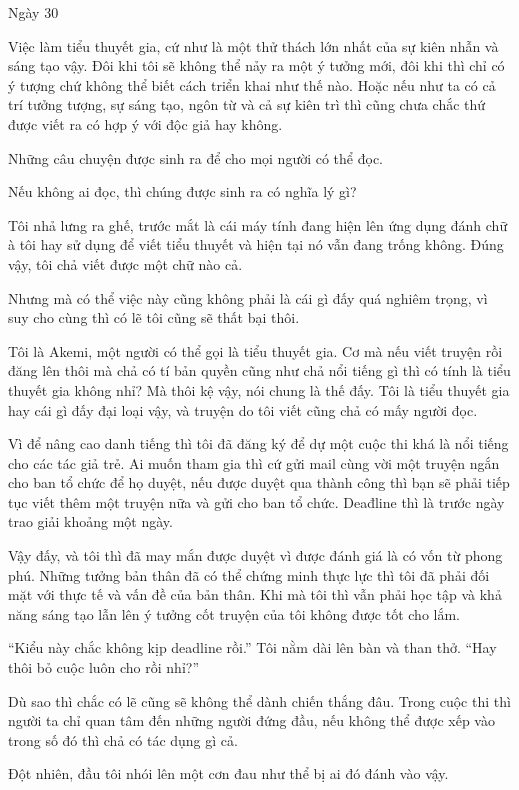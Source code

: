 {Ngày 30}
{
Việc làm tiểu thuyết gia, cứ như là một thử thách lớn nhất của sự kiên
nhẫn và sáng tạo vậy. Đôi khi tôi sẽ không thể nảy ra một ý tưởng mới,
đôi khi thì chỉ có ý tượng chứ không thể biết cách triển khai như thế
nào. Hoặc nếu như ta có cả trí tưởng tượng, sự sáng tạo, ngôn từ và cả
sự kiên trì thì cũng chưa chắc thứ được viết ra có hợp ý với độc giả hay
không.

Những câu chuyện được sinh ra để cho mọi người có thể đọc.

Nếu không ai đọc, thì chúng được sinh ra có nghĩa lý gì?

Tôi nhả lưng ra ghế, trước mắt là cái máy tính đang hiện lên ứng dụng
đánh chữ à tôi hay sử dụng để viết tiểu thuyết và hiện tại nó vẫn đang
trống không. Đúng vậy, tôi chả viết được một chữ nào cả.

Nhưng mà có thể việc này cũng không phải là cái gì đấy quá nghiêm trọng,
vì suy cho cùng thì có lẽ tôi cũng sẽ thất bại thôi.

Tôi là Akemi, một người có thể gọi là tiểu thuyết gia. Cơ mà nếu viết
truyện rồi đăng lên thôi mà chả có tí bản quyền cũng như chả nổi tiếng
gì thì có tính là tiểu thuyết gia không nhỉ? Mà thôi kệ vậy, nói chung
là thế đấy. Tôi là tiểu thuyết gia hay cái gì đấy đại loại vậy, và
truyện do tôi viết cũng chả có mấy người đọc.

Vì để nâng cao danh tiếng thì tôi đã đăng ký để dự một cuộc thi khá là
nổi tiếng cho các tác giả trẻ. Ai muốn tham gia thì cứ gửi mail cùng vời
một truyện ngắn cho ban tổ chức để họ duyệt, nếu được duyệt qua thành
công thì bạn sẽ phải tiếp tục viết thêm một truyện nữa và gửi cho ban tổ
chức. Deađline thì là trước ngày trao giải khoảng một ngày.

Vậy đấy, và tôi thì đã may mắn được duyệt vì được đánh giá là có vốn từ
phong phú. Những tưởng bản thân đã có thể chứng minh thực lực thì tôi đã
phải đối mặt với thực tế và vấn đề của bản thân. Khi mà tôi thì vẫn phải
học tập và khả năng sáng tạo lẫn lên ý tưởng cốt truyện của tôi không
được tốt cho lắm.

``Kiểu này chắc không kịp deadline rồi.'' Tôi nằm dài lên bàn và than
thở. ``Hay thôi bỏ cuộc luôn cho rồi nhỉ?''

Dù sao thì chắc có lẽ cũng sẽ không thể dành chiến thắng đâu. Trong cuộc
thi thì người ta chỉ quan tâm đến những người đứng đầu, nếu không thể
được xếp vào trong số đó thì chả có tác dụng gì cả.

Đột nhiên, đầu tôi nhói lên một cơn đau như thể bị ai đó đánh vào vậy.

}
